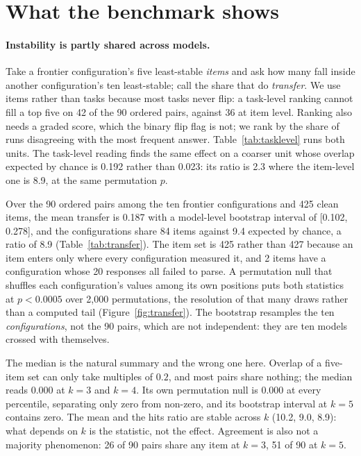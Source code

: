 \documentclass[11pt]{article}
\begin{document}
\section{What the benchmark shows}
\label{sec:results}




\paragraph{Instability is partly shared across models.} Take a frontier configuration's five
least-stable \emph{items} and ask how many fall inside another configuration's ten least-stable;
call the share that do \emph{transfer}. We use items rather than tasks because most tasks never
flip: a task-level ranking cannot fill a top five on 42 of the 90 ordered pairs, against 36 at
item level. Ranking also needs a graded score, which the binary flip flag is not; we rank by
the share of runs disagreeing with the most frequent answer. Table~\ref{tab:tasklevel} runs both
units. The task-level reading finds the same effect on a coarser unit whose overlap expected by
chance is 0.192 rather than 0.023: its ratio is 2.3 where the item-level one is 8.9, at the
same permutation $p$.

Over the 90 ordered pairs among the ten frontier configurations and 425 clean items, the mean
transfer is 0.187 with a model-level bootstrap interval of [0.102, 0.278], and the configurations
share 84 items against 9.4 expected by chance, a ratio of 8.9 (Table~\ref{tab:transfer}). The item
set is 425 rather than 427 because an item enters only where every configuration measured it, and
2 items have a configuration whose 20 responses all failed to parse. A
permutation null that shuffles each configuration's values among its own positions puts both
statistics at $p < 0.0005$ over 2{,}000 permutations, the resolution of that many draws rather
than a computed tail (Figure~\ref{fig:transfer}). The bootstrap
resamples the ten \emph{configurations}, not the 90 pairs, which are not independent: they are ten
models crossed with themselves.

The median is the natural summary and the wrong one here. Overlap of a five-item set can only take
multiples of $0.2$, and most pairs share nothing; the median reads 0.000 at $k = 3$ and
$k = 4$. Its own permutation null is 0.000 at every percentile, separating only zero from
non-zero, and its bootstrap interval at $k = 5$ contains zero. The mean and the hits ratio are
stable across $k$ (10.2, 9.0, 8.9): what depends on $k$ is the statistic, not the effect.
Agreement is also not a majority phenomenon: 26 of 90 pairs share any item at $k = 3$, 51 of 90 at
$k = 5$.
\end{document}
